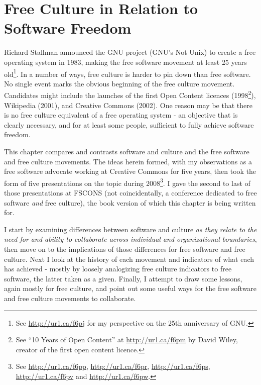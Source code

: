 \begin{savequote}
\end{savequote}
\chapter{Free Culture in Relation to Software Freedom}
\label{c:free_culture_software_freedom}

Richard Stallman announced the GNU project (GNU's Not Unix) to create a free
operating system in 1983, making the free software movement at least 25 years
old\footnote{See \url{http://ur1.ca/f6pj} for my perspective on the 25th
anniversary of GNU.}. In a number of ways, free culture is harder to pin down
than free software. No single event marks the obvious beginning of the free
culture movement. Candidates might include the launches of the f\hbox{}irst Open
Content licences (1998\footnote{See ``10 Years of Open Content'' at
\url{http://ur1.ca/f6pm} by David Wiley, creator of the f\hbox{}irst open
content licence.}), Wikipedia (2001), and Creative Commons (2002).  One reason
may be that there is no free culture equivalent of a free operating system - an
objective that is clearly necessary, and for at least some people,
suf\hbox{}f\hbox{}icient to fully achieve software freedom.

This chapter compares and contrasts software and culture and the free software
and free culture movements. The ideas herein formed, with my observations as a
free software advocate working at Creative Commons for f\hbox{}ive years, then
took the form of f\hbox{}ive presentations on the topic during 2008\footnote{See
\url{http://ur1.ca/f6pp}, \url{http://ur1.ca/f6pr}, \url{http://ur1.ca/f6ps},
\url{http://ur1.ca/f6pv} and \url{http://ur1.ca/f6pw}.}. I gave the second to
last of those presentations at FSCONS (not coincidentally, a conference
dedicated to free software \textit{and} free culture), the book version of which
this chapter is being written for.

I start by examining dif\hbox{}ferences between software and culture \textit{as
they relate to the need for and ability to collaborate across individual and
organizational boundaries}, then move on to the implications of those
dif\hbox{}ferences for free software and free culture. Next I look at the
history of each movement and indicators of what each has achieved - mostly by
loosely analogizing free culture indicators to free software, the latter taken
as a given. F\hbox{}inally, I attempt to draw some lessons, again mostly for
free culture, and point out some useful ways for the free software and free
culture movements to collaborate.

